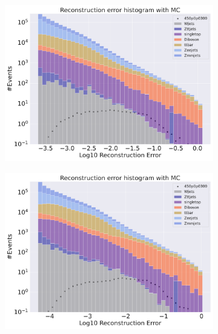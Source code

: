 \begin{figure}[H]
    \centering
    \begin{subfigure}{.45\textwidth}
        \includegraphics[width=\textwidth]{Figures/AE_testing/big/2lep/b_data_recon_big_rm3_feats_sig_450p0p0300_.pdf}
        \caption{ }
        \label{fig:AE_2lep_big_450_recon_etmiss}
    \end{subfigure}
    \hfill
    \begin{subfigure}{.45\textwidth}
        \includegraphics[width=\textwidth]{Figures/AE_testing/small/2lep/b_data_recon_big_rm3_feats_sig_450p0p0300_.pdf}
        \caption{}
        \label{fig:AE_2lep_small_450_recon_etmiss}
    \end{subfigure}

\end{figure}

